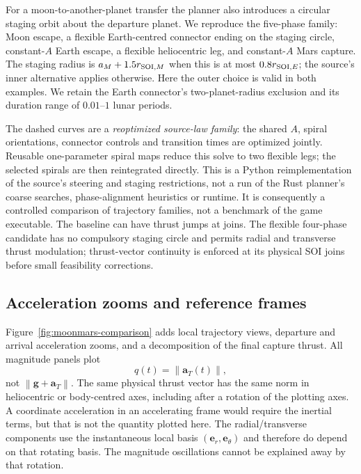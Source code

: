 \documentclass[journal, a4paper]{IEEEtran}
\newcommand{\norm}[1]{\left\lVert#1\right\rVert}
\begin{document}
For a moon-to-another-planet transfer the planner also introduces a circular staging orbit about the departure planet. We reproduce the five-phase family: Moon escape, a flexible Earth-centred connector ending on the staging circle, constant-$A$ Earth escape, a flexible heliocentric leg, and constant-$A$ Mars capture. The staging radius is $a_M+1.5r_{{\rm SOI},M}$ when this is at most $0.8r_{{\rm SOI},E}$; the source's inner alternative applies otherwise. Here the outer choice is valid in both examples. We retain the Earth connector's two-planet-radius exclusion and its duration range of $0.01$--$1$ lunar periods.

The dashed curves are a \emph{reoptimized source-law family}: the shared $A$, spiral orientations, connector controls and transition times are optimized jointly. Reusable one-parameter spiral maps reduce this solve to two flexible legs; the selected spirals are then reintegrated directly. This is a Python reimplementation of the source's steering and staging restrictions, not a run of the Rust planner's coarse searches, phase-alignment heuristics or runtime. It is consequently a controlled comparison of trajectory families, not a benchmark of the game executable. The baseline can have thrust jumps at joins. The flexible four-phase candidate has no compulsory staging circle and permits radial and transverse thrust modulation; thrust-vector continuity is enforced at its physical SOI joins before small feasibility corrections.

\subsection{Acceleration zooms and reference frames}
Figure~\ref{fig:moonmars-comparison} adds local trajectory views, departure and arrival acceleration zooms, and a decomposition of the final capture thrust. All magnitude panels plot
\begin{equation}
 q(t)=\norm{\mathbf a_T(t)},
\end{equation}
not $\norm{\mathbf g+\mathbf a_T}$. The same physical thrust vector has the same norm in heliocentric or body-centred axes, including after a rotation of the plotting axes. A coordinate acceleration in an accelerating frame would require the inertial terms, but that is not the quantity plotted here. The radial/transverse components use the instantaneous local basis $(\mathbf e_r,\mathbf e_\theta)$ and therefore do depend on that rotating basis. The magnitude oscillations cannot be explained away by that rotation.
\end{document}
